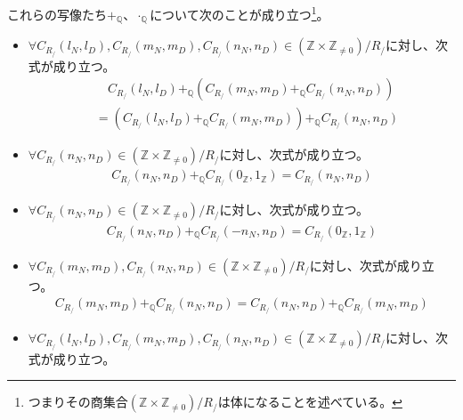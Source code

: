 \documentclass[dvipdfmx]{jsarticle}
\begin{document}
\begin{thm}\label{1.2.6.16}
これらの写像たち$+_{\mathbb{Q}}$、$\cdot_{\mathbb{Q}}$について次のことが成り立つ\footnote{つまりその商集合$\left( \mathbb{Z} \times \mathbb{Z}_{\neq 0} \right) /R_{/} $は体になることを述べている。}。
\begin{itemize}
\item
  $\forall C_{R_{/}}\left( l_{N},l_{D} \right),C_{R_{/}}\left( m_{N},m_{D} \right),C_{R_{/}}\left( n_{N},n_{D} \right) \in \left( \mathbb{Z} \times \mathbb{Z}_{\neq 0} \right) /R_{/} $に対し、次式が成り立つ。
\begin{align*}
&\quad C_{R_{/}}\left( l_{N},l_{D} \right) +_{\mathbb{Q}}\left( C_{R_{/}}\left( m_{N},m_{D} \right) +_{\mathbb{Q}}C_{R_{/}}\left( n_{N},n_{D} \right) \right) \\
&= \left( C_{R_{/}}\left( l_{N},l_{D} \right) +_{\mathbb{Q}}C_{R_{/}}\left( m_{N},m_{D} \right) \right) +_{\mathbb{Q}}C_{R_{/}}\left( n_{N},n_{D} \right)
\end{align*}
\item
  $\forall C_{R_{/}}\left( n_{N},n_{D} \right) \in \left( \mathbb{Z} \times \mathbb{Z}_{\neq 0} \right) /R_{/} $に対し、次式が成り立つ。
\begin{align*}
C_{R_{/}}\left( n_{N},n_{D} \right) +_{\mathbb{Q}}C_{R_{/}}\left( 0_{\mathbb{Z}},1_{\mathbb{Z}} \right) = C_{R_{/}}\left( n_{N},n_{D} \right)
\end{align*}
\item
  $\forall C_{R_{/}}\left( n_{N},n_{D} \right) \in \left( \mathbb{Z} \times \mathbb{Z}_{\neq 0} \right) /R_{/} $に対し、次式が成り立つ。
\begin{align*}
C_{R_{/}}\left( n_{N},n_{D} \right) +_{\mathbb{Q}}C_{R_{/}}\left( - n_{N},n_{D} \right) = C_{R_{/}}\left( 0_{\mathbb{Z}},1_{\mathbb{Z}} \right)
\end{align*}
\item
  $\forall C_{R_{/}}\left( m_{N},m_{D} \right),C_{R_{/}}\left( n_{N},n_{D} \right) \in \left( \mathbb{Z} \times \mathbb{Z}_{\neq 0} \right) /R_{/} $に対し、次式が成り立つ。
\begin{align*}
C_{R_{/}}\left( m_{N},m_{D} \right) +_{\mathbb{Q}}C_{R_{/}}\left( n_{N},n_{D} \right) = C_{R_{/}}\left( n_{N},n_{D} \right) +_{\mathbb{Q}}C_{R_{/}}\left( m_{N},m_{D} \right)
\end{align*}
\item
  $\forall C_{R_{/}}\left( l_{N},l_{D} \right),C_{R_{/}}\left( m_{N},m_{D} \right),C_{R_{/}}\left( n_{N},n_{D} \right) \in \left( \mathbb{Z} \times \mathbb{Z}_{\neq 0} \right) /R_{/} $に対し、次式が成り立つ。

\end{itemize}
\end{thm}
\end{document}
